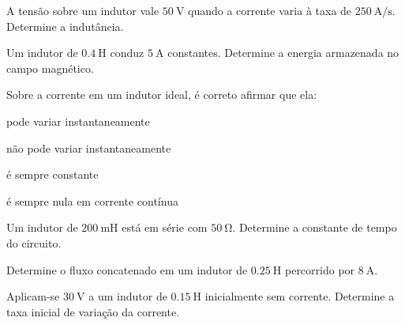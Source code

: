 \blocofixacao
\begin{questao}[1]{}

A tensão sobre um indutor vale $\SI{50}{\volt}$ quando a corrente varia à taxa
de $\SI{250}{\ampere\per\second}$. Determine a indutância.


\end{questao}
\begin{questao}[1]{}

Um indutor de $\SI{0.4}{\henry}$ conduz $\SI{5}{\ampere}$ constantes. Determine
a energia armazenada no campo magnético.


\end{questao}
\begin{questao}[1]{}

Sobre a corrente em um indutor ideal, é correto afirmar que ela:
\begin{alternativas}[2]
\item pode variar instantaneamente
\item não pode variar instantaneamente
\item é sempre constante
\item é sempre nula em corrente contínua
\end{alternativas}


\end{questao}
\begin{questao}[1]{}

Um indutor de $\SI{200}{\milli\henry}$ está em série com $\SI{50}{\ohm}$.
Determine a constante de tempo do circuito.


\end{questao}
\begin{questao}[1]{}

Determine o fluxo concatenado em um indutor de $\SI{0.25}{\henry}$ percorrido
por $\SI{8}{\ampere}$.


\end{questao}
\begin{questao}[1]{}

Aplicam-se $\SI{30}{\volt}$ a um indutor de $\SI{0.15}{\henry}$ inicialmente
sem corrente. Determine a taxa inicial de variação da corrente.


\end{questao}

